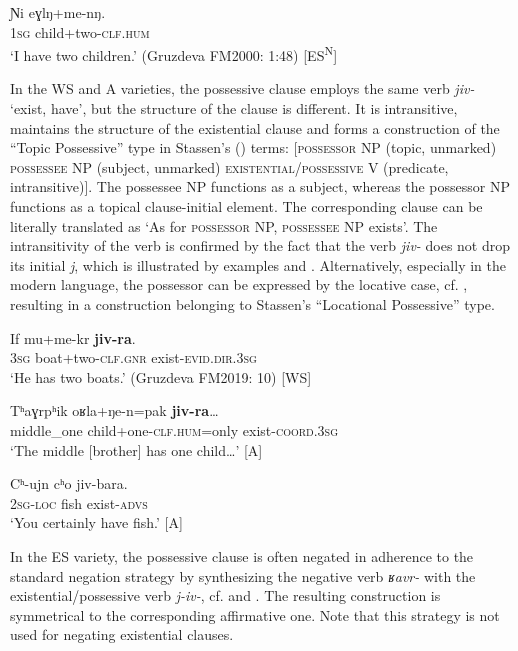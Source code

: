 \documentclass[output=paper,colorlinks,citecolor=brown]{langscibook}
\begin{document}
\ea\label{ex:niv:45}
    \gll Ɲi eɣlŋ+me-nŋ. \\ 
         \textsc{1sg} child+two-\textsc{clf.hum} \\
    \glt ‘I have two children.’ (Gruzdeva FM2000: 1:48) [ES\textsuperscript{N}]
\z 

In the WS and A varieties, the possessive clause employs the same verb \textit{jiv-} ‘exist, have’, but the structure of the clause is different. It is intransitive, maintains the structure of the existential clause and forms a construction of the “Topic Possessive” type in Stassen's (\citeyear[58]{Stassen2009}) terms: [\textsc{possessor} \textsc{NP} (topic, unmarked) \textsc{possessee} \textsc{NP} (subject, unmarked) \textsc{existential/possessive} \textsc{V} (predicate, intransitive)]. The possessee NP functions as a subject, whereas the possessor NP functions as a topical clause-initial element. The corresponding clause can be literally translated as ‘As for \textsc{possessor} \textsc{NP,} \textsc{possessee} \textsc{NP} exists’. The intransitivity of the verb is confirmed by the fact that the verb \textit{jiv-} does not drop its initial \textit{j}, which is illustrated by examples  and . Alternatively, especially in the modern language, the possessor can be expressed by the locative case, cf. , resulting in a construction belonging to Stassen’s “Locational Possessive” type.

\ea\label{ex:niv:46}
    \gll If mu+me-kr \textbf{jiv-ra}. \\ 
         \textsc{3sg} boat+two-\textsc{clf.gnr} exist-\textsc{evid.dir.3sg} \\
    \glt ‘He has two boats.’ (Gruzdeva FM2019: 10) [WS]
\z 

\ea\label{ex:niv:47}
    \gll Tʰaɣrpʰik oʁla+ŋe-n=pak \textbf{jiv-ra}… \\ 
         middle\_one child+one-\textsc{clf.hum}=only exist-\textsc{coord.3sg} \\
    \glt ‘The middle [brother] has one child…’ \citep[160]{Panfilov1965} [A]
\z 

\ea\label{ex:niv:48}
    \gll Cʰ-ujn cʰo jiv-bara. \\ 
         2\textsc{sg-loc} fish exist-\textsc{advs} \\
    \glt ‘You certainly have fish.’ \citep[121]{Panfilov1965} [A]
\z 

In the ES variety, the possessive clause is often negated in adherence to the standard negation strategy by synthesizing the negative verb \textit{ʁavr-} with the existential/possessive verb \textit{j-iv-}, cf.  and . The resulting construction is symmetrical to the corresponding affirmative one. Note that this strategy is not used for negating existential clauses.
\end{document}
